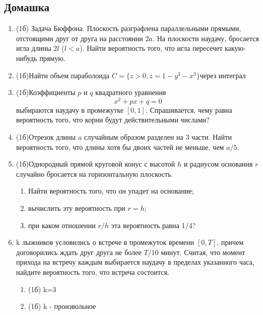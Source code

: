 \documentclass[a4paper, 14pt]{extarticle}
\begin{document}
\subsection*{Домашка}
\begin{enumerate}
	\item (1б) Задача Бюффона. Плоскость разграфлена параллельными
	прямыми, отстоящими друг от друга на расстоянии $2a$. На плоскости
	наудачу, бросается игла длины $2l$ ($l<a$). Найти вероятность того, что
	игла пересечет какую-нибудь прямую.
    \item (1б)Найти объем параболоида $C = \{z>0,z = 1-y^3-x^3\}$через интеграл
    \item (1б)Коэффициенты $p$ и $q$ квадратного уравнения
	$$x^2 + px + q = 0$$
	выбираются наудачу в промежутке $[0,1]$. Спрашивается, чему равна 
	вероятность того, что корни будут действительными числами?
	
	\item (1б)Отрезок длины $a$ случайным образом разделен на 3 части. Найти вероятность того, 
	что длины хотя бы двоих частей не меньше, чем $a/5$.
	\item (1б)Однородный прямой круговой конус с 
	высотой $h$ и радиусом основания $r$ случайно бросается на
	горизонтальную плоскость.
	\begin{enumerate}
		\item Найти вероятность того,
	что он упадет на основание; 
		\item вычислить эту 
	вероятность при $r=h$; 
	\item при каком отношении $r/h$ эта 
	вероятность равна 1/4?
	\end{enumerate}
	\item k лыжников условились о встрече в промежуток времени $[0,T]$, причем договорились
	ждать друг друга не более $T/10$ минут. Считая, что
	момент прихода на встречу каждым выбирается наудачу в пределах
	указанного часа, найдите вероятность того, что встреча состоится.
	\begin{enumerate}
	    \item (1б) k=3
	    \item (1б) k - произвольное
	\end{enumerate}
\end{enumerate}
	
\end{document}
